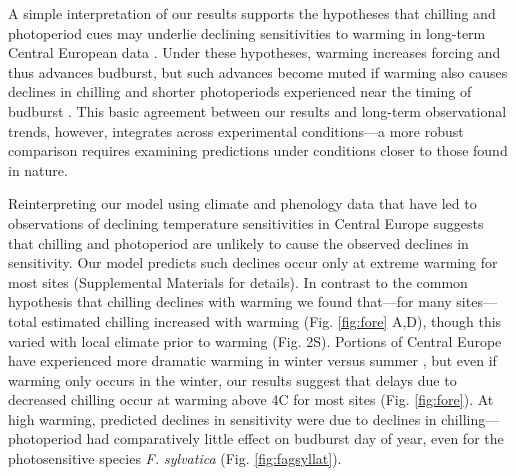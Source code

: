 \documentclass{article}
\begin{document}
\par A simple interpretation of our results supports the hypotheses that chilling and photoperiod cues may underlie declining sensitivities to warming in long-term Central European data \citep{Rutishauser:2008,yu2010,fu2015}. Under these hypotheses, warming increases forcing and thus advances budburst, but such advances become muted if warming also causes declines in chilling and shorter photoperiods experienced near the timing of budburst 
\citep{koerner2010a}. %
This basic agreement between our results and long-term observational trends, however, integrates across experimental conditions---a more robust comparison requires examining predictions under conditions closer to those found in nature.


\par Reinterpreting our model using climate and phenology data that have led to observations of declining temperature sensitivities in Central Europe suggests that chilling and photoperiod are unlikely to cause the observed declines in sensitivity. Our model predicts such declines occur only at extreme warming for most sites (Supplemental Materials for details). In contrast to the common hypothesis that chilling declines with warming we found that---for many sites---total estimated chilling increased with warming (Fig. \ref{fig:fore} A,D), though this varied with local climate prior to warming (Fig. 2S). 
Portions of Central Europe have experienced more dramatic warming in winter versus summer \citep{balling1998}, but even if warming only occurs in the winter, our results suggest that delays due to decreased chilling occur at warming above 4\degree C for most sites (Fig. \ref{fig:fore}). At high warming, predicted declines in sensitivity were due to declines in chilling---photoperiod had comparatively little effect on budburst day of year, even for the photosensitive species \emph{F. sylvatica} (Fig. \ref{fig:fagsyllat}). 
\end{document}
